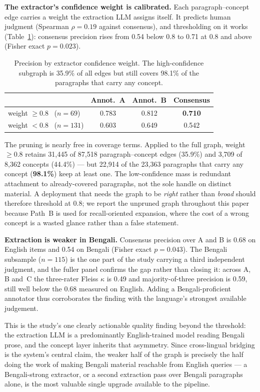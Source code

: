 \documentclass[11pt,a4paper]{article}
\begin{document}
\textbf{The extractor's confidence weight is calibrated.} Each
paragraph--concept edge carries a weight the extraction LLM assigns
itself. It predicts human judgment (Spearman $\rho = 0.19$ against
consensus), and thresholding on it works
(Table~\ref{tab:precision-weight}): consensus precision rises from 0.54
below $0.8$ to 0.71 at $0.8$ and above (Fisher exact $p = 0.023$).

\begin{table}[t]
\centering
\caption{Precision by extractor confidence weight. The high-confidence
subgraph is 35.9\% of all edges but still covers 98.1\% of the
paragraphs that carry any concept.}
\label{tab:precision-weight}
\begin{tabular}{lccc}
\toprule
 & Annot.\ A & Annot.\ B & Consensus\\
\midrule
weight $\geq 0.8$ \ ($n=69$)  & 0.783 & 0.812 & \textbf{0.710}\\
weight $< 0.8$ \ ($n=131$)    & 0.603 & 0.649 & 0.542\\
\bottomrule
\end{tabular}
\end{table}

The pruning is nearly free in coverage terms. Applied to the full graph,
weight $\geq 0.8$ retains 31{,}445 of 87{,}518 paragraph--concept edges
(35.9\%) and 3{,}709 of 8{,}362 concepts (44.4\%) --- but
22{,}914 of the 23{,}363 paragraphs that carry any concept
(\textbf{98.1\%}) keep at least one. The low-confidence mass is
redundant attachment to already-covered paragraphs, not the sole
handle on distinct material. A deployment that needs the graph to be
\emph{right} rather than \emph{broad} should therefore threshold at
$0.8$; we report the unpruned graph throughout this paper because Path~B
is used for recall-oriented expansion, where the cost of a wrong concept
is a wasted glance rather than a false statement.

\textbf{Extraction is weaker in Bengali.} Consensus precision over A and
B is 0.68 on English items and 0.54 on Bengali (Fisher exact
$p = 0.043$). The Bengali subsample ($n = 115$) is the one part of the
study carrying a third independent judgment, and the fuller panel
confirms the gap rather than closing it: across A, B and~C the
three-rater Fleiss $\kappa$ is 0.49 and majority-of-three precision is
0.59, still well below the 0.68 measured on English. Adding a
Bengali-proficient annotator thus corroborates the finding with the
language's strongest available judgement.

This is the study's one clearly actionable quality finding beyond the
threshold: the extraction LLM is a predominantly English-trained model
reading Bengali prose, and the concept layer inherits that asymmetry.
Since cross-lingual bridging is the system's central claim, the weaker
half of the graph is precisely the half doing the work of making Bengali
material reachable from English queries --- a Bengali-strong extractor,
or a second extraction pass over Bengali paragraphs alone, is the most
valuable single upgrade available to the pipeline.
\end{document}
